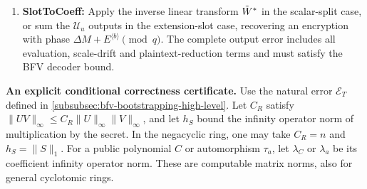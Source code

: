 \begin{tcolorbox}[title={\textbf{\tboxlabel{\ref*{subsubsec:bfv-bootstrapping-summary}} BFV Bootstrapping}}]
\begin{enumerate}
 At each division, reinterpret the scale from $\lfloor q/p^j\rfloor$ to $\lfloor q/p^{j-1}\rfloor$ and include the drift $-\delta_jw$ derived above. The final scale is $\lfloor q/p^r\rfloor=\Delta$. No modular inverse of $p$ is assumed.
\item \textbf{\textsf{SlotToCoeff}:} Apply the inverse linear transform $\tilde W^*$ in the scalar-split case, or sum the $\mathcal U_u$ outputs in the extension-slot case, recovering an encryption with phase $\Delta M+E^{\langle b\rangle}\pmod q$. The complete output error includes all evaluation, scale-drift and plaintext-reduction terms and must satisfy the BFV decoder bound.
\end{enumerate}
\end{tcolorbox}

\textbf{An explicit conditional correctness certificate.} Use the natural error $\mathcal E_T$ defined in \autoref{subsubsec:bfv-bootstrapping-high-level}. Let $C_R$ satisfy $\|UV\|_\infty\leq C_R\|U\|_\infty\|V\|_\infty$, and let $h_S$ bound the infinity operator norm of multiplication by the secret. In the negacyclic ring, one may take $C_R=n$ and $h_S=\|S\|_1$. For a public polynomial $C$ or automorphism $\tau_a$, let $\lambda_C$ or $\lambda_a$ be its coefficient infinity operator norm. These are computable matrix norms, also for general cyclotomic rings.

